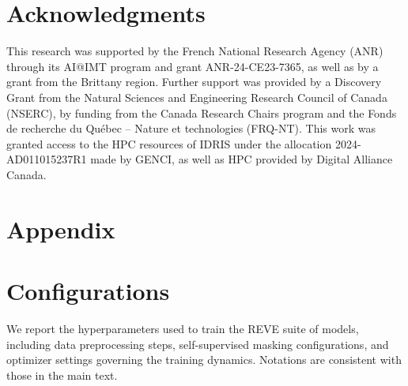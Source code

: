 \documentclass{article}
\begin{document}
\section{Acknowledgments}

This research was supported by the French National Research Agency (ANR) through its AI@IMT program and grant ANR-24-CE23-7365, as well as by a grant from the Brittany region. Further support was provided by a Discovery Grant from the Natural Sciences and Engineering Research Council of Canada (NSERC), by funding from the Canada Research Chairs program and the Fonds de recherche du Québec – Nature et technologies (FRQ-NT). This work was granted access to the HPC resources of IDRIS under the allocation 2024-AD011015237R1 made by GENCI, as well as HPC provided by Digital Alliance Canada. 

\vfill
\pagebreak


\medskip


\newpage
\appendix

\section*{Appendix}

\section{Configurations}

We report the hyperparameters used to train the REVE suite of models, including data preprocessing steps, self-supervised masking configurations, and optimizer settings governing the training dynamics. Notations are consistent with those in the main text.
\end{document}
